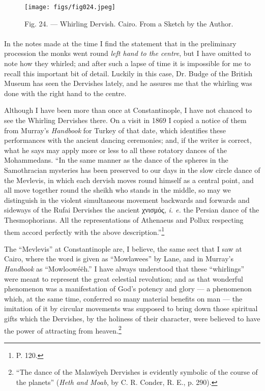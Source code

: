 \documentclass[a4paper, 11pt, oneside, polutonikogreek, english]{article}
\begin{document}
\begin{figure}[H]
\centering
\texttt{[image: figs/fig024.jpeg]}
\caption[Fig. 24. --- Whirling Dervish.]{Fig. 24. --- Whirling Dervish. Cairo. From a Sketch by the Author.}
\end{figure}
\paragraph{}
In the notes made at the time I find the statement that in the preliminary procession the monks went round \emph{left hand to the centre}, but I have omitted to note how they whirled; and after such a lapse of time it is impossible for me to recall this important bit of detail. Luckily in this case, Dr. Budge of the British Museum has seen the Dervishes lately, and he assures me that the whirling was done with the right hand to the centre.

Although I have been more than once at Constantinople, I have not chanced to see the Whirling Dervishes there. On a visit in 1869 I copied a notice of them from Murray's \emph{Handbook} for Turkey of that date, which identifies these performances with the ancient dancing ceremonies; and, if the writer is correct, what he says may apply more or less to all these rotatory dances of the Mohammedans. ``In the same manner as the dance of the spheres in the Samothracian mysteries has been preserved to our days in the slow circle dance of the Mevlevis, in which each dervish moves round himself as a central point, and all move together round the sheikh who stands in the middle, so may we distinguish in the violent simultaneous movement backwards and forwards and sideways of the Rufai Dervishes the ancient χνισμός, \emph{i. e.} the Persian dance of the Thesmophorians. All the representations of Athenaeus and Pollux respecting them accord perfectly with the above description.''\footnote{P. 120.}

The ``Mevlevis'' at Constantinople are, I believe, the same sect that I saw at Cairo, where the word is given as ``Mowlawees'' by Lane, and in Murray's \emph{Handbook} as ``Mowloowéëh.'' I have always understood that these ``whirlings'' were meant to represent the great celestial revolution; and as that wonderful phenomenon was a manifestation of God's potency and glory --- a phenomenon which, at the same time, conferred so many material benefits on man --- the imitation of it by circular movements was supposed to bring down those spiritual gifts which the Dervishes, by the holiness of their character, were believed to have the power of attracting from heaven.\footnote{``The dance of the Malawîyeh Dervishes is evidently symbolic of the course of the planets'' (\emph{Heth and Moab}, by C. R. Conder, R. E., p. 290).}
\clearpage
\end{document}
